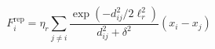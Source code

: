 \[
F_i^{\mathrm{rep}}=\eta_r\sum_{j\ne i}\frac{\exp\!\left(-d_{ij}^2/2\ell_r^2\right)}{d_{ij}^2+\delta^2}\left(x_i-x_j\right)
\]
